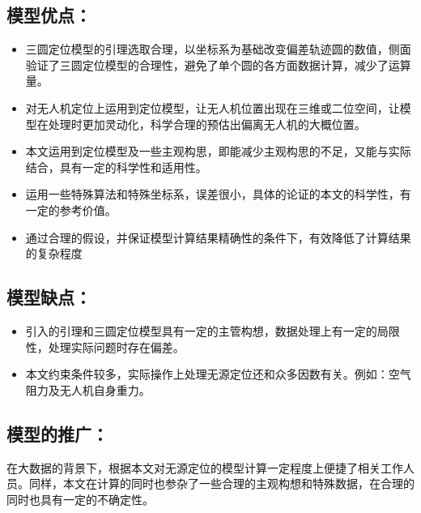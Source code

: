 \subsection{模型优点：}

\begin{itemize}
    \item 三圆定位模型的引理选取合理，以坐标系为基础改变偏差轨迹圆的数值，侧面验证了三圆定位模型的合理性，避免了单个圆的各方面数据计算，减少了运算量。\cite{TongJiDaXueShuXueXiGaoDengShuXue}
    \item 对无人机定位上运用到定位模型，让无人机位置出现在三维或二位空间，让模型在处理时更加灵动化，科学合理的预估出偏离无人机的大概位置。
    \item 本文运用到定位模型及一些主观构思，即能减少主观构思的不足，又能与实际结合，具有一定的科学性和适用性。
    \item 运用一些特殊算法和特殊坐标系，误差很小，具体的论证的本文的科学性，有一定的参考价值。
    \item 通过合理的假设，并保证模型计算结果精确性的条件下，有效降低了计算结果的复杂程度
\end{itemize}

\subsection{模型缺点：}

\begin{itemize}
    \item 引入的引理和三圆定位模型具有一定的主管构想，数据处理上有一定的局限性，处理实际问题时存在偏差。
    \item 本文约束条件较多，实际操作上处理无源定位还和众多因数有关。例如：空气阻力及无人机自身重力。
\end{itemize}

\subsection{模型的推广：}

在大数据的背景下，根据本文对无源定位的模型计算一定程度上便捷了相关工作人员。同样，本文在计算的同时也参杂了一些合理的主观构想和特殊数据，在合理的同时也具有一定的不确定性。
